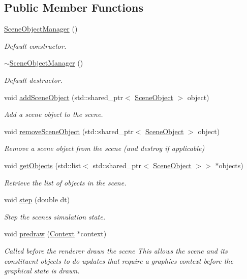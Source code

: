 \subsection*{Public Member Functions}
\begin{DoxyCompactItemize}
\item 
\hyperlink{class_scene_object_manager_a589afc363b4e3f7d04f253c43205763a}{Scene\+Object\+Manager} ()
\begin{DoxyCompactList}\small\item\em Default constructor. \end{DoxyCompactList}\item 
\hyperlink{class_scene_object_manager_adffb8c511196411d515c9b230b85c8e5}{$\sim$\+Scene\+Object\+Manager} ()
\begin{DoxyCompactList}\small\item\em Default destructor. \end{DoxyCompactList}\item 
void \hyperlink{class_scene_object_manager_a4231d373cedd650cd5a6ee7930f76994}{add\+Scene\+Object} (std\+::shared\+\_\+ptr$<$ \hyperlink{class_scene_object}{Scene\+Object} $>$ object)
\begin{DoxyCompactList}\small\item\em Add a scene object to the scene. \end{DoxyCompactList}\item 
void \hyperlink{class_scene_object_manager_a00b65df9f837802b33150a51e3315278}{remove\+Scene\+Object} (std\+::shared\+\_\+ptr$<$ \hyperlink{class_scene_object}{Scene\+Object} $>$ object)
\begin{DoxyCompactList}\small\item\em Remove a scene object from the scene (and destroy if applicable) \end{DoxyCompactList}\item 
void \hyperlink{class_scene_object_manager_ae760816e4028cc680dce44dde42ced52}{get\+Objects} (std\+::list$<$ std\+::shared\+\_\+ptr$<$ \hyperlink{class_scene_object}{Scene\+Object} $>$$>$ $\ast$objects)
\begin{DoxyCompactList}\small\item\em Retrieve the list of objects in the scene. \end{DoxyCompactList}\item 
void \hyperlink{class_scene_object_manager_a95eb6fa59723180a1ced2775249a0afe}{step} (double dt)
\begin{DoxyCompactList}\small\item\em Step the scene\textquotesingle{}s simulation state. \end{DoxyCompactList}\item 
void \hyperlink{class_scene_object_manager_a895153bc766085c9f94e4be72733b807}{predraw} (\hyperlink{class_context}{Context} $\ast$context)
\begin{DoxyCompactList}\small\item\em Called before the renderer draws the scene This allows the scene and its constituent objects to do updates that require a graphics context before the graphical state is drawn. \end{DoxyCompactList}\end{DoxyCompactItemize}
